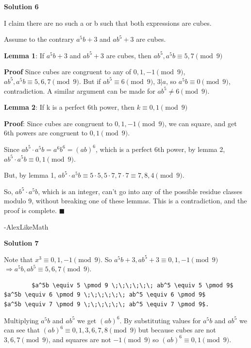 \begin{enumerate}
 



\textbf{Solution 6}

I claim there are no such a or b such that both expressions are cubes.

 Assume to the contrary $a^5b +3$ and $ab^5 + 3$ are cubes. 

 \textbf{Lemma 1}: If $a^5b +3$ and $ab^5 + 3$ are cubes, then $ab^5, a^5b \equiv 5,7 \pmod 9$

 \textbf{Proof} Since cubes are congruent to any of $0, 1, -1 \pmod 9$, $ab^5,a^5b \equiv 5,6,7 \pmod 9$. But if $ab^5 \equiv 6 \pmod 9$, $3|a$, so $a^5b \equiv 0 \pmod 9$, contradiction. A similar argument can be made for $ab^5 \neq 6 \pmod 9$. 

 
\textbf{Lemma 2}: If k is a perfect 6th power, then $k \equiv 0,1 \pmod 9$ 

 \textbf{Proof}: Since cubes are congruent to $0, 1,  -1 \pmod 9$, we can square, and get 6th powers are congruent to $0, 1 \pmod 9$.

 
Since $ab^5 \cdot a^5b = a^6 b^6 = (ab)^6$, which is a perfect 6th power, by lemma 2, $ab^5 \cdot a^5b \equiv 0,1 \pmod 9$.

 But, by lemma 1, $ab^5 \cdot a^5b \equiv 5 \cdot 5, 5 \cdot 7, 7 \cdot 7 \equiv 7, 8, 4 \pmod 9$. 

 So, $ab^5 \cdot a^5b$, which is an integer, can't go into any of the possible residue classes modulo 9, without breaking one of these lemmas. This is a contradiction, and the proof is complete. $\blacksquare$

 -AlexLikeMath

 


 



\textbf{Solution 7}

Note that $x^3 \equiv 0,1,-1 \pmod 9$. So $a^5b+3, ab^5+3\equiv 0,1,-1\pmod{9}$$\Rightarrow a^5b, ab^5 \equiv 5,6,7 \pmod 9$. 

 \begin{verbatim}
		$a^5b \equiv 5 \pmod 9 \;\;\;\;\;\; ab^5 \equiv 5 \pmod 9$           $a^5b \equiv 6 \pmod 9 \;\;\;\;\;\; ab^5 \equiv 6 \pmod 9$           $a^5b \equiv 7 \pmod 9 \;\;\;\;\;\; ab^5 \equiv 7 \pmod 9$.
\end{verbatim}

Multiplying $a^5b$ and $ab^5$ we get $(ab)^6$. By substituting values for $a^5b$ and $ab^5$ we can see that $(ab)^6 \equiv 0,1,3,6,7,8 \pmod 9$ but because cubes are not $3,6,7 \pmod 9$, and squares are not $-1\pmod 9$ so $\boxed{(ab)^6 \equiv 0,1 \pmod 9}$.


\end{enumerate}
